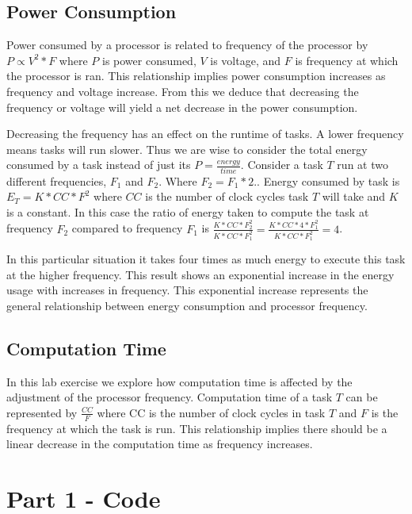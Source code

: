 \documentclass{article} %
\begin{document}
\subsection{Power Consumption}
Power consumed by a processor is related to frequency of the processor by $P \propto V^2*F$ where $P$ is power consumed, $V$ is voltage, and $F$ is frequency at which the processor is ran.
This relationship implies power consumption increases as frequency and voltage increase. From this we deduce that decreasing the frequency or voltage will yield a net decrease in the power consumption. 

Decreasing the frequency has an effect on the runtime of tasks. A lower frequency means tasks will run slower. Thus we are wise to consider the total energy consumed by a task instead of just its $P = \frac{energy}{time}$.
Consider a task $T$ run at two different frequencies, $F_{1}$ and $F_{2}$. Where $F_{2} = F_{1}*2.$.
Energy consumed by task is $E_{T} = K*CC*F^2$ where $CC$ is the number of clock cycles task $T$ will take and $K$ is a constant. In this case the ratio of energy taken to compute the task at frequency $F_{2}$ compared to frequency $F_{1}$ is $\frac{K*CC*F_{2}^2}{K*CC*F_{1}^2} = \frac{K*CC*4*F_{1}^2}{K*CC*F_{1}^2} = 4$.

In this particular situation it takes four times as much energy to execute this task at the higher frequency. This result shows an exponential increase in the energy usage with increases in frequency. This exponential increase represents the general relationship between energy consumption and processor frequency.

\subsection{Computation Time}
In this lab exercise we explore how computation time is affected by the adjustment of the processor frequency.
Computation time of a task $T$ can be represented by $\frac{CC}{F}$ where CC is the number of clock cycles in task $T$ and $F$ is the frequency at which the task is run.
This relationship implies there should be a linear decrease in the computation time as frequency increases.

\section{Part 1 - Code}
\end{document}
